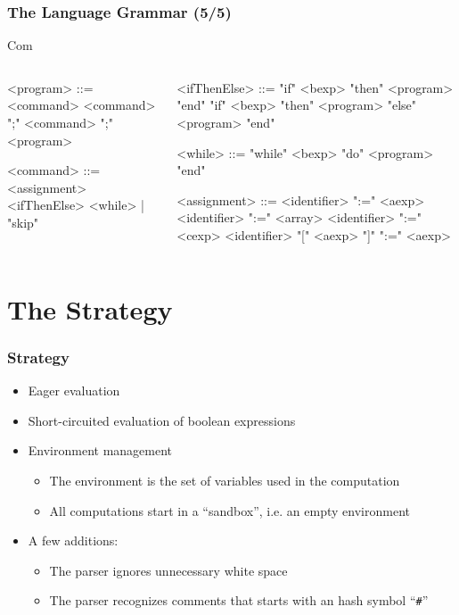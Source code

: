\documentclass{beamer}
\begin{document}
\begin{frame}[fragile]
\footnotesize
\frametitle{The Language Grammar (5/5)}
\begin{block}{Com}
\begin{columns}
\begin{grammar}
	<program> ::= <command>
	\alt <command> ";"
	\alt <command> ";" <program>

	<command> ::= <assignment>
	\alt <ifThenElse>
	\alt <while> | "skip"

\end{grammar}
\begin{grammar}
	<ifThenElse> ::= "if" <bexp> "then" <program> "end"
	\alt "if" <bexp> "then" <program> "else" <program> "end"

	<while> ::= "while" <bexp> "do" <program> "end"

	<assignment> ::= <identifier> ":=" <aexp>
	\alt <identifier> ":=" <array>
	\alt <identifier> ":=" <cexp>
	\alt <identifier> "[" <aexp> "]" ":=" <aexp>
\end{grammar}
\end{columns}
\end{block}
\end{frame}

\section{The Strategy}
\begin{frame}
\frametitle{Strategy}
\begin{itemize}
	\item Eager evaluation
	\item Short-circuited evaluation of boolean expressions
	\item Environment management
		\begin{itemize}
			\item The environment is the set of variables used in the
				computation
			\item All computations start in a ``sandbox'', i.e. an empty
				environment
		\end{itemize}
	\item A few additions:
		\begin{itemize}
			\item The parser ignores unnecessary white space
			\item The parser recognizes comments that starts with an hash
				symbol ``\texttt{\#}''
		\end{itemize}
\end{itemize}
\end{frame}
\end{document}
